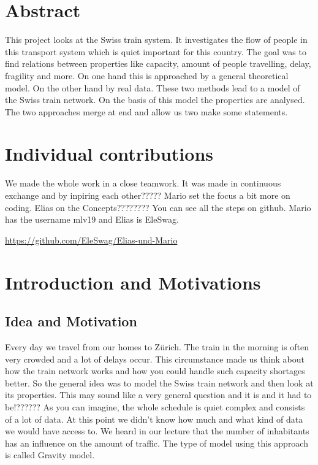 \documentclass[11pt]{article}
\begin{document}
\section{Abstract}

This project looks at the Swiss train system. It investigates the flow of people in this transport system which is quiet important for this country. The goal was to find relations between properties like capacity, amount of people travelling, delay, fragility and more. On one hand this is approached  by a general theoretical model. On the other hand by real data. These two methods lead to a model of the Swiss train  network. On the basis of this model the properties are analysed. The two approaches merge at end and allow us two make some statements.
 

\section{Individual contributions}

We made the whole work in a close teamwork. It was made in continuous exchange and by inpiring each other????? Mario set the focus a bit more on coding. Elias on the Concepts???????? You can see all the steps on github. Mario has the username mlv19 and Elias is EleSwag.\newline

\url{https://github.com/EleSwag/Elias-und-Mario}

\section{Introduction and Motivations}

\subsection{Idea and Motivation}


Every day we travel from our homes to Z\"urich. The train in the morning is often very crowded and a lot of delays occur. This circumstance made us think about how the train network works and how you could handle such capacity shortages better. 
So the general idea was to model the Swiss train network and then look at its properties. This may sound like a very general question and it is and it had to be!?????? As you can imagine, the whole schedule is quiet complex and consists of a lot of data. At this point we didn't know how much and what kind of data we would have access to. We heard in our lecture that the number of inhabitants has an influence on the amount of traffic. The type of model using this approach is called Gravity model.
\end{document}
